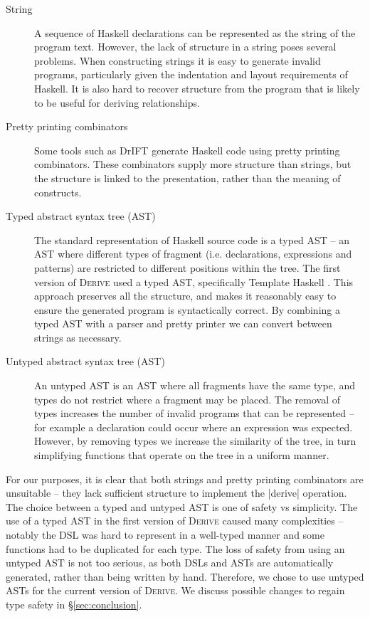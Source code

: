 \documentclass{llncs}
\newcommand{\derive}{\textsc{Derive}}
\begin{document}
\begin{description}
\item[String] A sequence of Haskell declarations can be represented as the string of the program text. However, the lack of structure in a string poses several problems. When constructing strings it is easy to generate invalid programs, particularly given the indentation and layout requirements of Haskell. It is also hard to recover structure from the program that is likely to be useful for deriving relationships.
\item[Pretty printing combinators] Some tools such as DrIFT \cite{drift} generate Haskell code using pretty printing combinators. These combinators supply more structure than strings, but the structure is linked to the presentation, rather than the meaning of constructs.
\item[Typed abstract syntax tree (AST)] The standard representation of Haskell source code is a typed AST -- an AST where different types of fragment (i.e. declarations, expressions and patterns) are restricted to different positions within the tree. The first version of \derive{} used a typed AST, specifically Template Haskell \cite{template_haskell}. This approach preserves all the structure, and makes it reasonably easy to ensure the generated program is syntactically correct. By combining a typed AST with a parser and pretty printer we can convert between strings as necessary.
\item[Untyped abstract syntax tree (AST)] An untyped AST is an AST where all fragments have the same type, and types do not restrict where a fragment may be placed. The removal of types increases the number of invalid programs that can be represented -- for example a declaration could occur where an expression was expected. However, by removing types we increase the similarity of the tree, in turn simplifying functions that operate on the tree in a uniform manner.
\end{description}

For our purposes, it is clear that both strings and pretty printing combinators are unsuitable -- they lack sufficient structure to implement the |derive| operation. The choice between a typed and untyped AST is one of safety vs simplicity. The use of a typed AST in the first version of \derive{} caused many complexities -- notably the DSL was hard to represent in a well-typed manner and some functions had to be duplicated for each type. The loss of safety from using an untyped AST is not too serious, as both DSLs and ASTs are automatically generated, rather than being written by hand. Therefore, we chose to use untyped ASTs for the current version of \derive{}. We discuss possible changes to regain type safety in \S\ref{sec:conclusion}.
\end{document}
